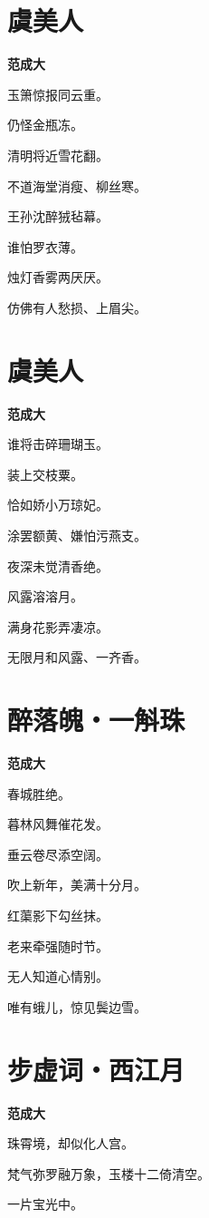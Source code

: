 \documentclass[12pt,a4paper]{ctexbook}
\begin{document}
\section{虞美人}
\textbf{范成大}\par\vspace{0.5em}
玉箫惊报同云重。\par
仍怪金瓶冻。\par
清明将近雪花翻。\par
不道海堂消瘦、柳丝寒。\par
王孙沈醉狨毡幕。\par
谁怕罗衣薄。\par
烛灯香雾两厌厌。\par
仿佛有人愁损、上眉尖。\par

\section{虞美人}
\textbf{范成大}\par\vspace{0.5em}
谁将击碎珊瑚玉。\par
装上交枝粟。\par
恰如娇小万琼妃。\par
涂罢额黄、嫌怕污燕支。\par
夜深未觉清香绝。\par
风露溶溶月。\par
满身花影弄凄凉。\par
无限月和风露、一齐香。\par

\section{醉落魄・一斛珠}
\textbf{范成大}\par\vspace{0.5em}
春城胜绝。\par
暮林风舞催花发。\par
垂云卷尽添空阔。\par
吹上新年，美满十分月。\par
红蕖影下勾丝抹。\par
老来牵强随时节。\par
无人知道心情别。\par
唯有蛾儿，惊见鬓边雪。\par

\section{步虚词・西江月}
\textbf{范成大}\par\vspace{0.5em}
珠霄境，却似化人宫。\par
梵气弥罗融万象，玉楼十二倚清空。\par
一片宝光中。\par
\end{document}
